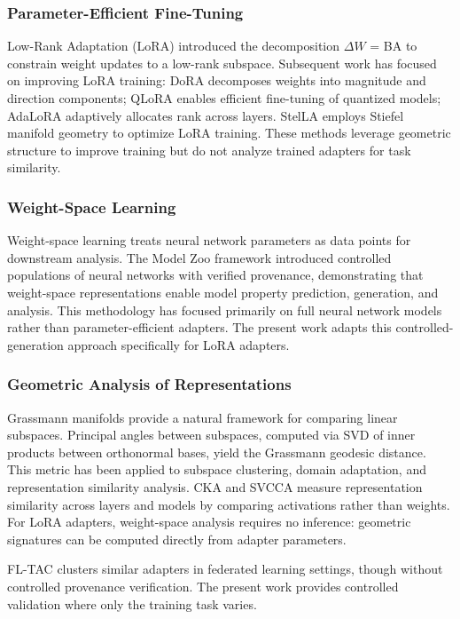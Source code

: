 
\subsubsection{Parameter-Efficient Fine-Tuning}

Low-Rank Adaptation (LoRA) introduced the decomposition $\Delta W$ = BA to constrain weight updates to a low-rank subspace. Subsequent work has focused on improving LoRA training: DoRA decomposes weights into magnitude and direction components; QLoRA enables efficient fine-tuning of quantized models; AdaLoRA adaptively allocates rank across layers. StelLA employs Stiefel manifold geometry to optimize LoRA training. These methods leverage geometric structure to improve training but do not analyze trained adapters for task similarity.

\subsubsection{Weight-Space Learning}

Weight-space learning treats neural network parameters as data points for downstream analysis. The Model Zoo framework introduced controlled populations of neural networks with verified provenance, demonstrating that weight-space representations enable model property prediction, generation, and analysis. This methodology has focused primarily on full neural network models rather than parameter-efficient adapters. The present work adapts this controlled-generation approach specifically for LoRA adapters.

\subsubsection{Geometric Analysis of Representations}

Grassmann manifolds provide a natural framework for comparing linear subspaces. Principal angles between subspaces, computed via SVD of inner products between orthonormal bases, yield the Grassmann geodesic distance. This metric has been applied to subspace clustering, domain adaptation, and representation similarity analysis. CKA and SVCCA measure representation similarity across layers and models by comparing activations rather than weights. For LoRA adapters, weight-space analysis requires no inference: geometric signatures can be computed directly from adapter parameters.

FL-TAC clusters similar adapters in federated learning settings, though without controlled provenance verification. The present work provides controlled validation where only the training task varies.
